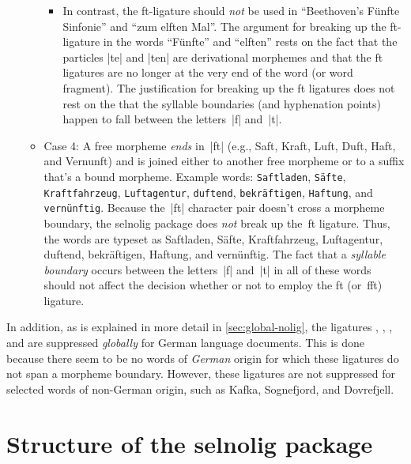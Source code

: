 \documentclass[11pt]{article}
\newcommand{\pkg}[1]{\textsf{#1}}
\newcommand{\opt}[1]{\texttt{#1}}
\begin{document}
\begin{itemize}
\begin{itemize}
\begin{itemize}
\item In contrast, the ft-ligature should \emph{not} be used in \enquote{Beethoven's Fünfte Sinfonie} and \enquote{zum elften Mal}. The argument for breaking up the ft-ligature in the words \enquote{Fünfte} and \enquote{elften} rests on the fact that the particles |te| and |ten| are derivational morphemes and that the ft ligatures are no longer at the very end of the word (or word fragment). The justification for breaking up the ft ligatures does not rest on the that the syllable boundaries (and hyphenation points) happen to fall between the letters~|f| and~|t|.

\end{itemize}

\item Case 4: A free morpheme \emph{ends} in~|ft| (e.g., Saft, Kraft, Luft, Duft, Haft, and Vernunft) and is joined either to another free morpheme or to a suffix that's a bound morpheme. Example words: 
\opt{Saftladen}, 
\opt{Säfte},  
\opt{Kraftfahrzeug}, 
\opt{Luftagentur}, 
\opt{duftend}, 
\opt{bekräftigen}, 
\opt{Haftung}, and 
\opt{vernünftig}. 
Because the~|ft| character pair doesn't cross a morpheme boundary, the \pkg{selnolig} package does \emph{not} break up the~ft ligature. Thus, the words are typeset as 
Saftladen, 
Säfte,
Kraftfahrzeug, 
Luftagentur, 
duftend, 
bekräftigen, 
Haftung, and 
vernünftig. 
The fact that a \emph{syllable boundary} occurs between the letters~|f| and~|t| in all of these words should not affect the decision whether or not to employ the ft (or~fft) ligature.
\end{itemize}
\end{itemize}

In addition, as is explained in more detail in \cref{sec:global-nolig}, the ligatures {\ebg {}, , }, and {\ebg{}} are suppressed \emph{globally} for German language documents. This is done because there seem to be no words of \emph{German} origin for which these ligatures do not span a morpheme boundary. However, these ligatures are not suppressed for selected words of non-German origin, such as {\ebg Kafka, Sognefjord, and Dovrefjell}. 




\section[Structure of the selnolig package]{Structure of the \pkg{selnolig} package} \label{sec:structure}
\end{document}
